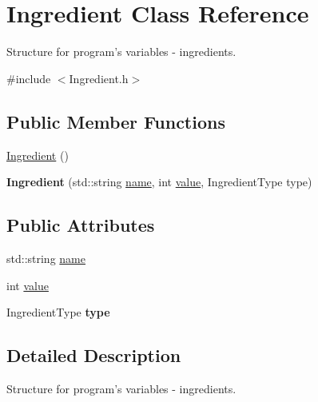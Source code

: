 \hypertarget{classIngredient}{\section{Ingredient Class Reference}
\label{classIngredient}
}


Structure for program's variables -\/ ingredients.  




{\ttfamily \#include $<$Ingredient.\-h$>$}

\subsection*{Public Member Functions}
\begin{DoxyCompactItemize}
\item 
\hyperlink{classIngredient_a738111e26d0765aabc92ebc036fad1d3}{Ingredient} ()
\item 
\hypertarget{classIngredient_a31d6a7520496b7a6b179f7dfbdceb2ca}{{\bfseries Ingredient} (std\-::string \hyperlink{classIngredient_a3473e340b8779b51b49fbea622207e78}{name}, int \hyperlink{classIngredient_aa95e40564ad71f9ec536fb8d3fa3b839}{value}, Ingredient\-Type type)}\label{classIngredient_a31d6a7520496b7a6b179f7dfbdceb2ca}

\end{DoxyCompactItemize}
\subsection*{Public Attributes}
\begin{DoxyCompactItemize}
\item 
std\-::string \hyperlink{classIngredient_a3473e340b8779b51b49fbea622207e78}{name}
\item 
int \hyperlink{classIngredient_aa95e40564ad71f9ec536fb8d3fa3b839}{value}
\item 
\hypertarget{classIngredient_a29a400e987a68bd02363b30b52e89710}{Ingredient\-Type {\bfseries type}}\label{classIngredient_a29a400e987a68bd02363b30b52e89710}

\end{DoxyCompactItemize}


\subsection{Detailed Description}
Structure for program's variables -\/ ingredients. 

